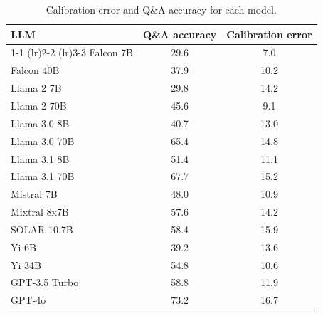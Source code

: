 \begin{table}[h]
\caption{Calibration error and Q\&A accuracy for each model.}
\label{tab:calibration_prob_max}
\centering
\begin{tabular}{lcc}
\toprule
LLM & Q\&A accuracy & Calibration error \\ 
\cmidrule(lr){1-1} \cmidrule(lr){2-2} \cmidrule(lr){3-3}
Falcon 7B & 29.6 & 7.0\\
Falcon 40B & 37.9 & 10.2\\
Llama 2 7B & 29.8 & 14.2\\
Llama 2 70B & 45.6 & 9.1\\
Llama 3.0 8B & 40.7 & 13.0\\
Llama 3.0 70B & 65.4 & 14.8\\
Llama 3.1 8B & 51.4 & 11.1\\
Llama 3.1 70B & 67.7 & 15.2\\
Mistral 7B & 48.0 & 10.9\\
Mixtral 8x7B & 57.6 & 14.2\\
SOLAR 10.7B & 58.4 & 15.9\\
Yi 6B & 39.2 & 13.6\\
Yi 34B & 54.8 & 10.6\\
GPT-3.5 Turbo & 58.8 & 11.9\\
GPT-4o & 73.2 & 16.7\\
\bottomrule
\end{tabular}
\end{table}
